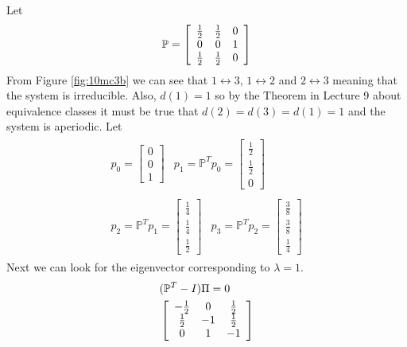 \documentclass[lecture,12pt,]{pcms-l}
\begin{document}
\begin{example}
Let
$$\mathbb{P} = \left[\begin{array}{c c c} \frac{1}{2} & \frac{1}{2} & 0 \\ 0 & 0 & 1 \\ \frac{1}{2} & \frac{1}{2} & 0 \end{array}\right]$$
From Figure \ref{fig:10mc3b} we can see that $1\leftrightarrow 3$, $1\leftrightarrow 2$ and $2\leftrightarrow 3$ meaning that the system is irreducible. Also, $d(1)=1$ so by the Theorem in Lecture 9 about equivalence classes it must be true that $d(2)=d(3)=d(1)=1$ and the system is aperiodic. Let
\begin{align*}
\begin{split}
p_0 = \left[\begin{array}{c} 0 \\ 0 \\ 1 \end{array}\right]
\end{split}
\begin{split}
p_1 = \mathbb{P}^Tp_0 = \left[\begin{array}{c} \frac{1}{2} \\ \frac{1}{2} \\ 0 \end{array}\right]
\end{split} \\
\begin{split}
p_2 = \mathbb{P}^Tp_1 = \left[\begin{array}{c} \frac{1}{4} \\ \frac{1}{4} \\ \frac{1}{2} \end{array}\right]
\end{split}
\begin{split}
p_3 = \mathbb{P}^Tp_2 = \left[\begin{array}{c} \frac{3}{8} \\ \frac{3}{8} \\ \frac{1}{4} \end{array}\right]
\end{split}
\end{align*}
Next we can look for the eigenvector corresponding to $\lambda=1$.
\begin{align*}
&(\mathbb{P}^T-I)\Pi = 0 \\
&\left[\begin{array}{c c c} -\frac{1}{2} & 0 & \frac{1}{2} \\ \frac{1}{2} & -1 & \frac{1}{2} \\ 0 & 1 & -1 \end{array}\right]

\end{align*}
\end{example}
\end{document}
